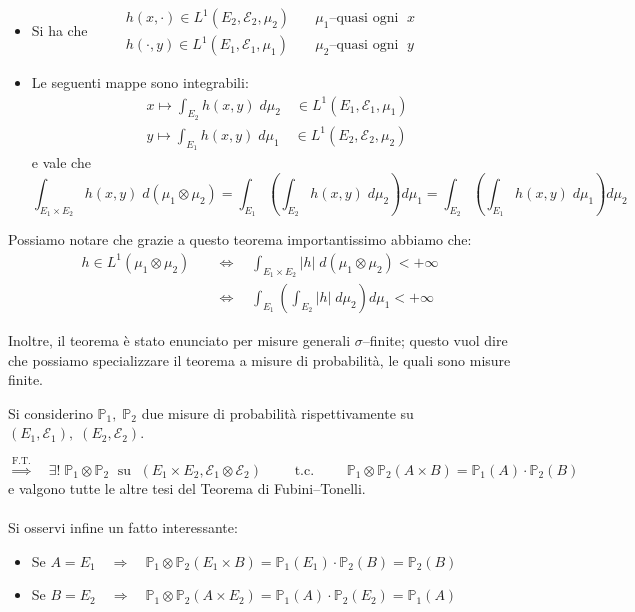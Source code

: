 \begin{teorema}
\begin{enumerate}
            \begin{itemize}
                \item Si ha che $\qquad \begin{aligned}
                h(x, \cdot) \in L^1(E_2, \mathcal{E}_2, \mu_2) \quad &\mu_1\text{--quasi ogni }\;x\\
                h(\cdot, y) \in L^1(E_1, \mathcal{E}_1, \mu_1) \quad &\mu_2\text{--quasi ogni }\;y 
            \end{aligned}$
            \item Le seguenti mappe sono integrabili:
            \begin{align*}
                &x\longmapsto\int_{E_2} h(x, y)\;d\mu_2\quad\in L^1(E_1, \mathcal{E}_1, \mu_1)\\
                &y\longmapsto\int_{E_1}h(x, y)\;d\mu_1 \quad \in L^1(E_2, \mathcal{E}_2, \mu_2)
            \end{align*}
            e vale che 
            \[\boxed{\int_{E_1\times E_2}h(x, y)\;d(\mu_1\otimes \mu_2) = \int_{E_1}\left(\int_{E_2}h(x, y)\;d\mu_2\right)d\mu_1 = \int_{E_2}\left(\int_{E_1}h(x, y)\;d\mu_1\right)d\mu_2}\]
            \end{itemize}
        \end{enumerate}
\end{teorema}

\noindent Possiamo notare che grazie a questo teorema importantissimo abbiamo che:
\begin{align*}
    h\in L^1 (\mu_1 \otimes \mu_2)\quad & \iff \quad \int_{E_1\times E_2}|h|\;d(\mu_1\otimes \mu_2)<+\infty\\
    &\iff \quad \int_{E_1}\left(\int_{E_2}|h|\;d\mu_2\right)d\mu_1 <+\infty
\end{align*}

\bigskip
\noindent Inoltre, il teorema è stato enunciato per misure generali $\sigma$--finite; questo vuol dire che possiamo specializzare il teorema a misure di probabilità, le quali sono misure finite.

\medskip
\noindent Si considerino $\mathbb{P}_1, \;\mathbb{P}_2$ due misure di probabilità rispettivamente su $(E_1, \mathcal{E}_1), \;(E_2, \mathcal{E}_2)$.

\[\overset{\text{F.T.}}{\Longrightarrow} \quad \exists!\; \mathbb{P}_1\otimes \mathbb{P}_2\;\text{ su }\; (E_1\times E_2, \mathcal{E}_1 \otimes \mathcal{E}_2)\qquad \text{ t.c. }\qquad \mathbb{P}_1\otimes \mathbb{P}_2(A\times B)= \mathbb{P}_1(A)\cdot \mathbb{P}_2(B)\]
e valgono tutte le altre tesi del Teorema di Fubini--Tonelli.\\
\\
Si osservi infine un fatto interessante:
\begin{itemize}
    \item Se $A = E_1 \quad \Rightarrow\quad \mathbb{P}_1\otimes\mathbb{P}_2(E_1\times B) = \mathbb{P}_1(E_1)\cdot \mathbb{P}_2(B) = \mathbb{P}_2(B)$
    \item Se $B = E_2 \quad \Rightarrow\quad \mathbb{P}_1\otimes\mathbb{P}_2(A\times E_2) = \mathbb{P}_1(A)\cdot \mathbb{P}_2(E_2) = \mathbb{P}_1(A)$
\end{itemize}

